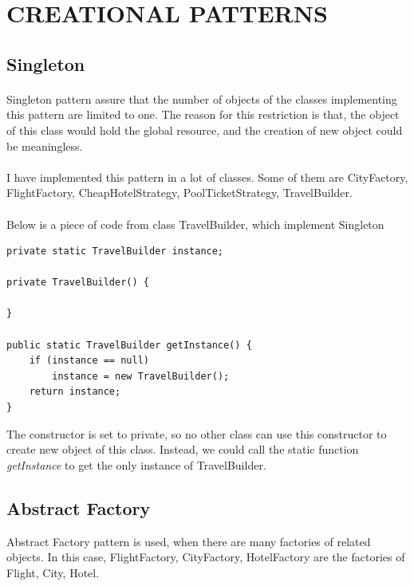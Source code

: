\section{CREATIONAL PATTERNS}
\subsection{Singleton}

\paragraph{}
Singleton pattern assure that the number of objects of the classes implementing this pattern are limited to one. The reason for this restriction is that, the object of this class would hold the global resource, and the creation of new object could be meaningless.

\paragraph{}
I have implemented this pattern in a lot of classes. Some of them are CityFactory, FlightFactory, CheapHotelStrategy, PoolTicketStrategy, TravelBuilder.

\paragraph{}
Below is a piece of code from class TravelBuilder, which implement Singleton

\begin{lstlisting}
private static TravelBuilder instance;

private TravelBuilder() {

}

public static TravelBuilder getInstance() {
	if (instance == null)
		instance = new TravelBuilder();
	return instance;
}
\end{lstlisting}

The constructor is set to private, so no other class can use this constructor to create new object of this class. Instead, we could call the static function \textit{getInstance} to get the only instance of TravelBuilder.

\newpage
\subsection{Abstract Factory}
Abstract Factory pattern is used, when there are many factories of related objects. In this case, FlightFactory, CityFactory, HotelFactory are the factories of Flight, City, Hotel. 

